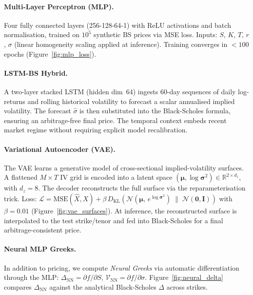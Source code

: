 \documentclass[12pt,a4paper]{article}
\begin{document}
\paragraph{Multi-Layer Perceptron (MLP).}
Four fully connected layers (256-128-64-1) with ReLU activations and batch
normalisation, trained on $10^5$ synthetic BS prices via MSE loss.
Inputs: $S$, $K$, $T$, $r$, $\sigma$ (linear homogeneity scaling applied at
inference).
Training converges in $< 100$ epochs (Figure~\ref{fig:mlp_loss}).

\paragraph{LSTM-BS Hybrid.}
A two-layer stacked LSTM (hidden dim~64) ingests 60-day sequences of daily
log-returns and rolling historical volatility to forecast a scalar annualised
implied volatility.
The forecast $\hat{\sigma}$ is then substituted into the Black-Scholes formula,
ensuring an arbitrage-free final price.
The temporal context embeds recent market regime without requiring explicit
model recalibration.

\paragraph{Variational Autoencoder (VAE).}
The VAE learns a generative model of cross-sectional implied-volatility surfaces.
A flattened $M\times T$ IV grid is encoded into a latent space
$(\boldsymbol{\mu}, \log\boldsymbol{\sigma}^2) \in \mathbb{R}^{2\times d_z}$,
with $d_z=8$.
The decoder reconstructs the full surface via the reparameterisation trick.
Loss: $\mathcal{L} = \mathrm{MSE}(\hat{X}, X)
+ \beta\,D_{\mathrm{KL}}(\mathcal{N}(\boldsymbol{\mu},\,e^{\log\boldsymbol{\sigma}^2})
\;\|\;\mathcal{N}(\mathbf{0},\mathbf{I}))$
with $\beta=0.01$ (Figure~\ref{fig:vae_surfaces}).
At inference, the reconstructed surface is interpolated to the test strike/tenor
and fed into Black-Scholes for a final arbitrage-consistent price.

\paragraph{Neural MLP Greeks.}
In addition to pricing, we compute \emph{Neural Greeks} via automatic
differentiation through the MLP: $\Delta_{\mathrm{NN}} = \partial f/\partial S$,
$\mathcal{V}_{\mathrm{NN}} = \partial f/\partial \sigma$.
Figure~\ref{fig:neural_delta} compares $\Delta_{\mathrm{NN}}$ against the
analytical Black-Scholes $\Delta$ across strikes.
\end{document}

